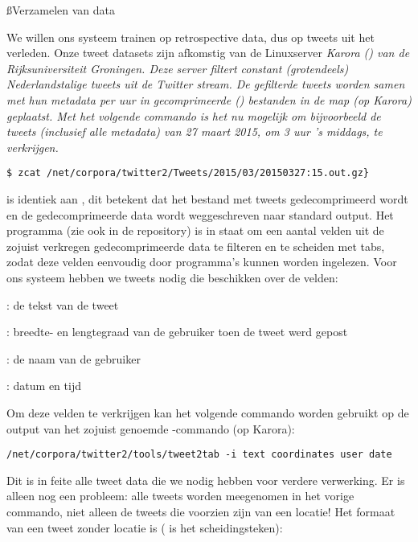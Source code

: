 {{\ss{Verzamelen van data}\label{dataverzamelen}

We willen ons systeem trainen op retrospective data, dus op tweets uit het 
verleden. Onze tweet datasets zijn afkomstig van de Linuxserver \it{Karora}
() van de Rijksuniversiteit Groningen. Deze server 
filtert constant 
(grotendeels) Nederlandstalige tweets uit de Twitter stream. De gefilterde 
tweets worden samen met hun metadata per uur in gecomprimeerde () 
bestanden in de map  (op Karora) geplaatst. 
Met het volgende commando is het nu mogelijk om bijvoorbeeld de tweets 
(inclusief alle 
metadata) van 27 maart 2015, om 3 uur 's middags, te verkrijgen.
\begin{lstlisting}
$ zcat /net/corpora/twitter2/Tweets/2015/03/20150327:15.out.gz}
\end{lstlisting}
 is identiek aan , dit betekent dat het bestand met 
tweets gedecomprimeerd wordt en de gedecomprimeerde data wordt weggeschreven 
naar standard output.
\vl
Het programma  (zie ook  in de 
repository) is in 
staat om een aantal velden uit de zojuist verkregen gedecomprimeerde data te 
filteren en te scheiden met tabs, zodat deze velden eenvoudig door programma's
kunnen worden ingelezen. Voor ons systeem hebben we tweets nodig die beschikken 
over de velden:

\begin{bullets}
\item {}: de tekst van de tweet
\item {}: breedte- en lengtegraad van de gebruiker toen de tweet 
werd
gepost
\item {}: de naam van de gebruiker
\item {}: datum en tijd
\end{bullets}

Om deze velden te verkrijgen kan het volgende commando worden gebruikt op de 
output van het zojuist genoemde -commando (op Karora):

\begin{lstlisting}
/net/corpora/twitter2/tools/tweet2tab -i text coordinates user date
\end{lstlisting}

Dit is in feite alle tweet data die we nodig hebben voor verdere verwerking. Er 
is alleen nog een probleem: alle tweets worden meegenomen in het vorige 
commando, niet alleen de tweets die voorzien zijn van een locatie! Het formaat 
van een tweet zonder locatie is ( is het scheidingsteken):

}}
